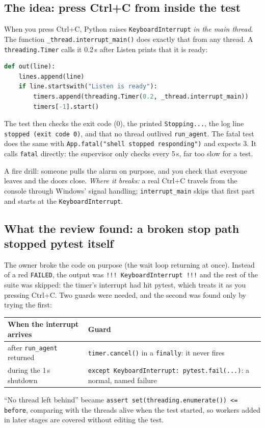 \documentclass[11pt,a4paper]{article}
\begin{document}
\subsection{The idea: press Ctrl+C from inside the test}
When you press Ctrl+C, Python raises \texttt{KeyboardInterrupt} \emph{in the main thread}. The
function \texttt{\_thread.interrupt\_main()} does exactly that from any thread. A
\texttt{threading.Timer} calls it 0.2\,s after Listen prints that it is ready:
\begin{lstlisting}[language=Python]
def out(line):
    lines.append(line)
    if line.startswith("Listen is ready"):
        timers.append(threading.Timer(0.2, _thread.interrupt_main))
        timers[-1].start()
\end{lstlisting}
\noindent The test then checks the exit code (0), the printed \texttt{Stopping...}, the log line
\texttt{stopped (exit code 0)}, and that no thread outlived \texttt{run\_agent}. The fatal test does
the same with \texttt{App.fatal("shell stopped responding")} and expects 3. It calls
\texttt{fatal} directly: the supervisor only checks every 5\,s, far too slow for a test.

\begin{analogy}
A fire drill: someone pulls the alarm on purpose, and you check that everyone leaves and the
doors close. \emph{Where it breaks:} a real Ctrl+C travels from the console through Windows'
signal handling; \texttt{interrupt\_main} skips that first part and starts at the
\texttt{KeyboardInterrupt}.
\end{analogy}

\subsection{What the review found: a broken stop path stopped pytest itself}
The owner broke the code on purpose (the wait loop returning at once). Instead of a red
\texttt{FAILED}, the output was \texttt{!!! KeyboardInterrupt !!!} and the rest of the suite was
skipped: the timer's interrupt had hit pytest, which treats it as you pressing Ctrl+C. Two guards
were needed, and the second was found only by trying the first:
\begin{center}
\begin{tabularx}{\textwidth}{l X}
\toprule
\textbf{When the interrupt arrives} & \textbf{Guard} \\
\midrule
after \texttt{run\_agent} returned & \texttt{timer.cancel()} in a \texttt{finally}: it never fires \\
during the 1\,s shutdown & \texttt{except KeyboardInterrupt: pytest.fail(...)}: a normal, named failure \\
\bottomrule
\end{tabularx}
\end{center}
\noindent ``No thread left behind'' became
\texttt{assert set(threading.enumerate()) <= before}, comparing with the threads alive when the
test started, so workers added in later stages are covered without editing the test.
\end{document}
